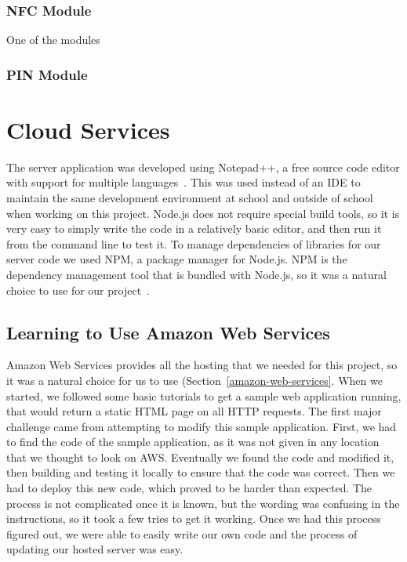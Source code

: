 \documentclass[12pt]{report}
\let\Oldsection\section
\renewcommand{\section}{\FloatBarrier\Oldsection}
\let\Oldsubsection\subsection
\renewcommand{\subsection}{\FloatBarrier\Oldsubsection}
\let\Oldsubsubsection\subsubsection
\renewcommand{\subsubsection}{\FloatBarrier\Oldsubsubsection}
\begin{document}
\subsubsection{NFC Module} \label{nfc-modules}

One of the modules 

\subsubsection{PIN Module} \label{pin-modules}




\section{Cloud Services} \label{cloud-services}

The server application was developed using Notepad++, a free source code editor with support
for multiple languages~\autocite{NOTEPADPLUSPLUS}. This was used instead of an IDE to maintain the same development
environment at school and outside of school when working on this project. Node.js does not
require special build tools, so it is very easy to simply write the code in a relatively basic
editor, and then run it from the command line to test it. To manage dependencies of libraries
for our server code we used NPM, a package manager for Node.js. NPM is the dependency management
tool that is bundled with Node.js, so it was a natural choice to use for our project~\autocite{NODENPM}.



\subsection{Learning to Use Amazon Web Services} \label{learning-to-use-amazon-web-services}

Amazon Web Services provides all the hosting that we needed for this project, so it was a
natural choice for us to use (Section~\ref{amazon-web-services}. When we started, we followed
some basic tutorials to get a sample
web application running, that would return a static HTML page on all HTTP requests. The first
major challenge came from attempting to modify this sample application. First, we had to find
the code of the sample application, as it was not given in any location that we thought to look on
AWS. Eventually we found the code and modified it, then building and testing it locally to
ensure that the code was correct. Then we had to deploy this new code, which proved to be
harder than expected. The process is not complicated once it is known, but the wording was
confusing in the instructions, so it took a few tries to get it working. Once we had this process
figured out, we were able to easily write our own code and the process of updating our hosted
server was easy.
\end{document}
